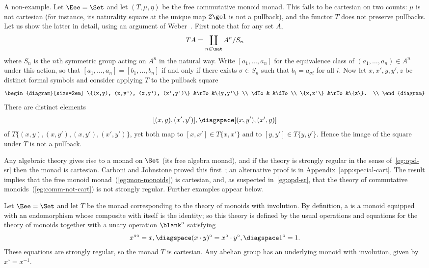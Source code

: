 \begin{example}		 
A non-example.  Let $\Eee=\Set$ and let $(T, \mu, \eta)$ be the free
commutative%
%
%
monoid monad.  This fails to be cartesian on two counts: $\mu$
is not cartesian (for instance, its naturality square at the unique map
$2\go 1$ is not a pullback), and the functor $T$ does not preserve
pullbacks.  Let us show the latter in detail, using an argument of
Weber~\cite[2.7.2]{Web}.%
%
%
 First note that for any set $A$,
\[
TA = \coprod_{n\in\nat} A^n / S_n
\]
where $S_n$ is the $n$th symmetric group acting on $A^n$ in the natural
way.  Write $[a_1, \ldots, a_n]$ for the equivalence class of $(a_1,
\ldots, a_n) \in A^n$ under this action, so that $[a_1, \ldots, a_n] =
[b_1, \ldots, b_n]$ if and only if there exists $\sigma \in S_n$ such that
$b_i = a_{\sigma i}$ for all $i$.  Now let $x, x', y, y', z$ be distinct
formal symbols and consider applying $T$ to the pullback square
\[
\begin{diagram}[size=2em]
\{(x,y), (x,y'), (x,y'), (x',y')\}	&\rTo	&\{y,y'\}	\\
\dTo					&	&\dTo		\\
\{x,x'\}				&\rTo	&\{z\}.		\\
\end{diagram}
\]
There are distinct elements
\[
[(x,y), (x',y')],
\diagspace
[(x,y'), (x',y)]
\]
of $T \{(x,y), (x,y'), (x,y'), (x',y')\}$, yet both map to $[x,x']
\in T\{x,x'\}$ and to $[y,y'] \in T\{y,y'\}$.  Hence the image of the
square under $T$ is not a pullback.
\end{example}

\begin{example}		%
%
%
%
%
Any algebraic theory gives rise to a monad on $\Set$ (its free algebra
monad), and if the theory is strongly regular in the sense
of~\ref{eg:opd-sr} then the monad is cartesian.  Carboni and Johnstone
proved this first~\cite{CJ}; an alternative proof is in
Appendix~\ref{app:special-cart}.  The result implies that the free monoid
monad~(\ref{eg:mon-monoids}) is cartesian, and, as suspected
in~\ref{eg:opd-sr}, that the theory of commutative
monoids~(\ref{eg:comm-not-cart}) is not strongly regular.  Further examples
appear below.
\end{example}

\begin{example}	
Let $\Eee=\Set$ and let $T$ be the monad corresponding to the theory of
monoids with involution.  By definition, a %
%
%
is a monoid equipped with an endomorphism whose composite with itself is
the identity; so this theory is defined by the usual operations and
equations for the theory of monoids together with a unary operation
$\blank^\circ$ satisfying
\[
x^{\circ\circ} = x,
\diagspace
(x\cdot y)^\circ = x^\circ \cdot y^\circ, 
\diagspace
1^\circ = 1.
\]
These equations are strongly regular, so the monad $T$ is cartesian.  Any
abelian group has an underlying monoid with involution, given by $x^\circ =
x^{-1}$.   
\end{example}

